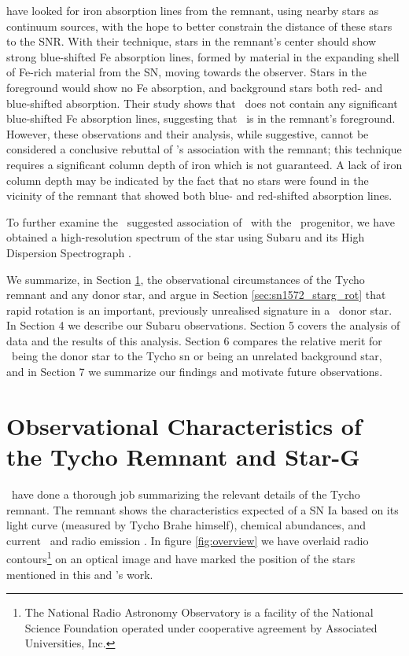 \citet{2007PASJ...59..811I} have looked for iron absorption lines from
the remnant, using nearby stars as continuum sources, with the hope to
better constrain the distance of these stars to the SNR. With their technique, stars in the
remnant's center should show strong blue-shifted Fe absorption lines,
formed by material in the expanding shell of Fe-rich material from the
SN, moving towards the observer.  Stars in the foreground would show
no Fe absorption, and background stars both red- and blue-shifted
absorption. Their study shows that \starg\ does not contain any
significant blue-shifted Fe absorption lines, suggesting that \starg\
is in the remnant's foreground. However, these observations and their
analysis, while suggestive, cannot be considered a conclusive rebuttal
of \starg's association with the remnant; this technique requires a significant column depth of iron which is not guaranteed. A lack of iron column depth may be indicated by the fact that no stars were found in the
vicinity of the remnant that showed both blue- and red-shifted absorption lines.

To further examine the \rl\ suggested association of \starg\ with the
\snia\ progenitor, we have obtained a high-resolution spectrum of the
star using Subaru and its High Dispersion Spectrograph
\citep{1998SPIE.3355..354N}.

We summarize, in Section \ref{sec:sn1572_starg:obschar}, the observational
circumstances of the Tycho remnant and any donor star, and argue in
Section \ref{sec:sn1572_starg_rot} that rapid rotation is an important, previously unrealised
signature in a \snia\ \gls{donor} star. In Section 4 we describe our
Subaru observations. Section 5 covers the analysis of data and the results of this analysis. Section 6 compares the relative merit for \starg\ being the donor star to the
Tycho \gls*{sn} or being an unrelated background star, and in Section 7 we summarize our findings and motivate future observations.

\section{Observational Characteristics of the Tycho Remnant and \hbox{Star-G}}
\label{sec:sn1572_starg:obschar}
\rl\ have done a thorough job summarizing the relevant details of the
Tycho remnant. The remnant shows the characteristics expected of a SN
Ia based on its light curve (measured by Tycho Brahe himself),
chemical abundances, and current \xray\ and radio emission
\citep{2004ApJ...612..357R}. In figure \ref{fig:overview} we have overlaid radio contours\footnote{The National Radio Astronomy Observatory is a facility of the National Science Foundation operated under cooperative agreement by Associated Universities, Inc.}  on an optical image and have marked the position of the stars mentioned in this and \rl's work.


